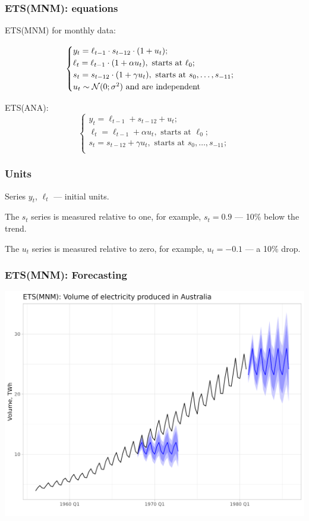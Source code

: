 \begin{frame}
	\frametitle{ETS(MNM): equations}
	
	ETS(MNM) for monthly data:
	
	\[
	\begin{cases}
		y_t = \ell_{t-1} \cdot s_{t-12} \cdot (1 + u_t); \\
		\ell_t = \ell_{t-1}\cdot (1 + \alpha u_t), \text{ starts at } \ell_0; \\
		s_t = s_{t-12}\cdot (1 + \gamma u_t), \text{ starts at } s_0, \ldots, s_{-11}; \\
		u_t \sim \mathcal{N}(0;\sigma^2) \text{ and are independent} \\
	\end{cases}
	\]
	
	\pause
	ETS(ANA):
	\[
	\begin{cases}
		y_t = \ell_{t-1} + s_{t-12} + u_t; \\
		\ell_t = \ell_{t-1} + \alpha u_t, \text{ starts at } \ell_0; \\
		s_t = s_{t-12} + \gamma u_t, \text{ starts at } s_0, \ldots, s_{-11}; \\
	\end{cases}
	\]
	
\end{frame}





\begin{frame}
	\frametitle{Units}
	
	Series $y_t$, $\ell_t$ — \alert{initial} units.
	
	\pause
		
	The $s_t$ series is measured relative to one, for example, $s_t = 0.9$ — 10\% below the trend.
	
	The $u_t$ series is measured relative to zero, for example, $u_t = -0.1$ — a 10\% drop.
	
\end{frame}



\begin{frame}
	\frametitle{ETS(MNM): Forecasting}
	
	\includegraphics[width=\textwidth]{pictures/om_ts_03-047.png}
	
	
\end{frame}


